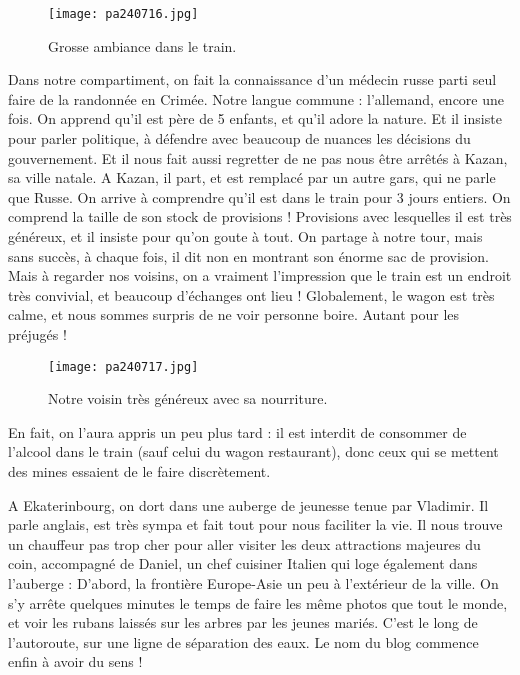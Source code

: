 \documentclass{book}
\begin{document}
\begin{wrapfigure}{l}{0.55\textwidth}
\centering
\texttt{[image: pa240716.jpg]}
\caption*{ Grosse ambiance dans le train.}
\end{wrapfigure}

Dans notre compartiment, on fait la connaissance d'un  médecin russe parti seul faire de la randonnée en Crimée. Notre langue commune : l'allemand, encore une fois. On apprend qu'il est père de 5 enfants, et qu'il adore la nature. Et il insiste pour parler politique, à défendre avec beaucoup de nuances les décisions du gouvernement. Et il nous fait aussi regretter de ne pas nous être arrêtés à Kazan, sa ville natale.
A Kazan, il part, et est remplacé par un autre gars, qui ne parle que Russe. On arrive à comprendre qu'il est dans le train pour 3 jours entiers. On comprend la taille de son stock de provisions ! Provisions avec lesquelles il est très généreux, et il insiste pour qu'on goute à tout. On partage à notre tour, mais sans succès, à chaque fois, il dit non en montrant son énorme sac de provision. Mais à regarder nos voisins, on a vraiment l'impression que le train est un endroit très convivial, et beaucoup d'échanges ont lieu !
Globalement, le wagon est très calme, et nous sommes surpris de ne voir personne boire. Autant pour les préjugés !


\begin{figure}[h]
\centering
\texttt{[image: pa240717.jpg]}
\caption*{ Notre voisin très généreux avec sa nourriture.}
\end{figure}

En fait, on l'aura appris un peu plus tard : il est interdit de consommer de l'alcool dans le train (sauf celui du wagon restaurant), donc ceux qui se mettent des mines essaient de le faire discrètement.

A Ekaterinbourg, on dort dans une auberge de jeunesse tenue par Vladimir. Il parle anglais, est très sympa et fait tout pour nous faciliter la vie. Il nous trouve un chauffeur pas trop cher pour aller visiter les deux attractions majeures du coin, accompagné de Daniel, un chef cuisiner Italien qui loge également dans l'auberge :
D'abord, la frontière Europe-Asie un peu à l'extérieur de la ville. On s'y arrête quelques minutes le temps de faire les même photos que tout le monde, et voir les rubans laissés sur les arbres par les jeunes mariés. C'est le long de l'autoroute, sur une ligne de séparation des eaux. Le nom du blog commence enfin à avoir du sens !
\end{document}
